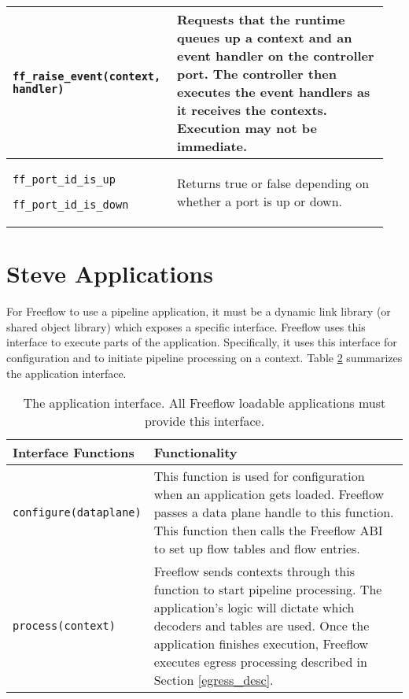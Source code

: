 \begin{table}
\begin{center}
\begin{tabular}{| p{0.4\linewidth} | p{0.55\linewidth} |}
\texttt{ff\_raise\_event(context, handler)} &
Requests that the runtime queues up a context and an event handler on the controller port. The controller then executes the event handlers as it receives the contexts. Execution may not be immediate. \\
\hline


\texttt{ff\_port\_id\_is\_up}

\texttt{ff\_port\_id\_is\_down} &

Returns true or false depending on whether a port is up or down. \\

\hline

\end{tabular}
\end{center}
\label{tbl:Freeflow_api}
\end{table}

\section{Steve Applications} \label{fp:app_interface}

For Freeflow to use a pipeline application, it must be a dynamic link library (or shared object library) which exposes a specific interface. Freeflow uses this interface to execute parts of the application. 
Specifically, it uses this interface for configuration and to initiate pipeline processing on a context.
Table \ref{tbl:steve_api} summarizes the application interface.

\begin{table}[ht]
\caption{The application interface. All Freeflow loadable applications must provide this interface.}
\begin{center}
\begin{tabular}{| p{0.3\linewidth} | p{0.7\linewidth} |}
\hline
Interface Functions & Functionality \\

\hline

\texttt{configure(dataplane)} & This function is used for configuration when an application gets loaded. Freeflow passes a data plane handle to this function. This function then calls the Freeflow ABI to set up flow tables and flow entries. \\

\hline

\texttt{process(context)} & Freeflow sends contexts through this function to start pipeline processing. The application's logic will dictate which decoders and tables are used. Once the application finishes execution, Freeflow executes egress processing described in Section \ref{egress_desc}. \\

\hline

\end{tabular}
\end{center}
\label{tbl:steve_api}
\end{table}


